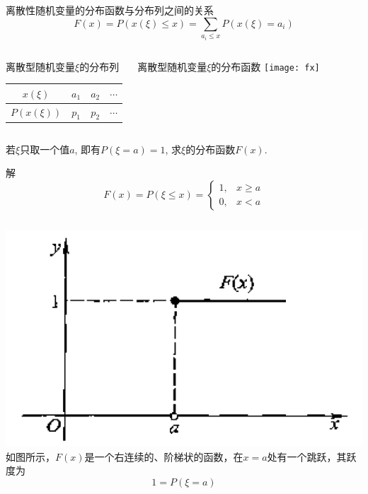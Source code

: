 \begin{frame}{离散性随机变量的分布函数与分布列之间的关系}
\[F(x)=P(x(\xi)\le x)= \sum_{a_i\le x}P(x(\xi)=a_i)\]
\begin{columns}
	\begin{block}{离散型随机变量$\xi$的分布列}
		\begin{tabular}{|c|c|c|c|}
			\hline 
			$x(\xi)$    & $a_1$ & $a_2$ & $\cdots$\\ 
			\hline 
			$P(x(\xi))$ & $p_1$ & $p_2$ & $\cdots$\\ 
			\hline 
		\end{tabular} 
	\end{block}
	\begin{block}{离散型随机变量$\xi$的分布函数}
		\texttt{[image: fx]}
	\end{block}
\end{columns}
\end{frame}

\begin{frame}
\begin{example}
	若$\xi$只取一个值$a$, 即有$P(\xi=a)=1$, 求$\xi$的分布函数$F(x)$.
\end{example}
\begin{block}{解}
	\[
	 F(x)=P(\xi\le x)= 
	 \begin{cases}
	 1, &x\ge a\\
	 0, &x<a
	 \end{cases}
	\]
	\begin{columns}
		\includegraphics[scale=0.3]{fx1}
		如图所示，$F(x)$是一个右连续的、阶梯状的函数，在$x=a$处有一个跳跃，其跃度为
		\[1=P(\xi=a)\]
	\end{columns}
\end{block}
\end{frame}

